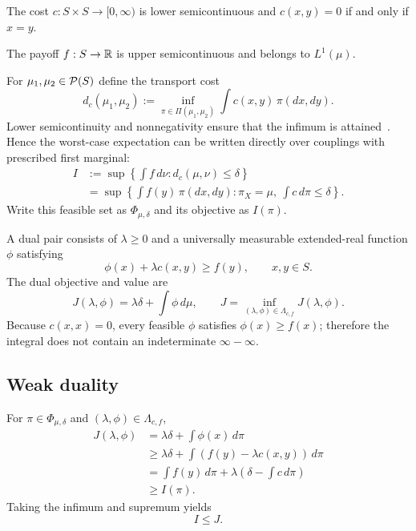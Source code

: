 \begin{assumption}
The cost $c:S\times S\to[0,\infty)$ is lower semicontinuous and
$c(x,y)=0$ if and only if $x=y$.
\end{assumption}

\begin{assumption}[A2: payoff]
The payoff $f:S\to\mathbb{R}$ is upper semicontinuous and belongs to $L^1(\mu)$.
\end{assumption}

For $\mu_1,\mu_2\in\mathcal{P}(S)$ define the transport cost
\begin{equation}
 d_c(\mu_1,\mu_2)
 :=\inf_{\pi\in\Pi(\mu_1,\mu_2)}\int c(x,y)\,\pi(dx,dy).
 \tag{2}
\end{equation}
Lower semicontinuity and nonnegativity ensure that the infimum is attained~\cite[Theorem~4.1]{Villani2008}.  Hence the worst-case
expectation can be written directly over couplings with prescribed first marginal:
\begin{align}
 I
 &:=\sup\left\{\int f\,d\nu:d_c(\mu,\nu)\le\delta\right\}\\
 &=\sup\left\{\int f(y)\,\pi(dx,dy):
       \pi_X=\mu,\ \int c\,d\pi\le\delta\right\}. \tag{3}
\end{align}
Write this feasible set as $\Phi_{\mu,\delta}$ and its objective as $I(\pi)$.

A dual pair consists of $\lambda\ge0$ and a universally measurable extended-real function
$\phi$ satisfying
\begin{equation}
 \phi(x)+\lambda c(x,y)\ge f(y),\qquad x,y\in S. \tag{4}
\end{equation}
The dual objective and value are
\[
 J(\lambda,\phi)=\lambda\delta+\int\phi\,d\mu,
 \qquad
 J=\inf_{(\lambda,\phi)\in\Lambda_{c,f}}J(\lambda,\phi).
\]
Because $c(x,x)=0$, every feasible $\phi$ satisfies $\phi(x)\ge f(x)$; therefore the integral does
not contain an indeterminate $\infty-\infty$.

\subsection{Weak duality}
For $\pi\in\Phi_{\mu,\delta}$ and $(\lambda,\phi)\in\Lambda_{c,f}$,
\begin{align*}
 J(\lambda,\phi)
 &=\lambda\delta+\int\phi(x)\,d\pi\\
 &\ge\lambda\delta+\int(f(y)-\lambda c(x,y))\,d\pi\\
 &=\int f(y)\,d\pi+
   \lambda\left(\delta-\int c\,d\pi\right)\\
 &\ge I(\pi).
\end{align*}
Taking the infimum and supremum yields
\begin{equation}
 I\le J. \tag{5}
\end{equation}

